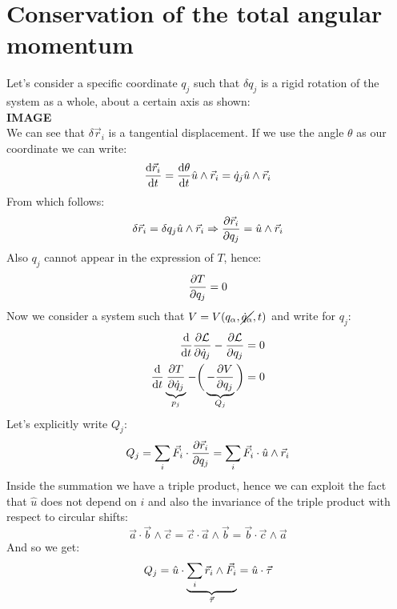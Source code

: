 \section{Conservation of the total angular momentum}
Let's consider a specific coordinate $q_j$ such that $\delta q_j$ is a rigid rotation of the system as a whole, about a certain axis as shown:
\\\textbf{IMAGE}\\
We can see that $\delta \vec{r}_i$ is a tangential displacement. If we use the angle $\theta$ as our coordinate we can write:
\begin{equation}
    \dv{\vec{r}_i}{t} = \dv{\theta}{t} \hat{u} \wedge \vec{r}_i = \dot{q}_j \hat{u} \wedge \vec{r}_i
\end{equation}
From which follows:
\begin{equation}
    \delta \vec{r}_i = \delta q_j \hat{u} \wedge \vec{r}_i \Rightarrow \pdv{\vec{r}_i}{q_j} = \hat{u} \wedge \vec{r}_i
\end{equation}
Also $q_j$ cannot appear in the expression of $T$, hence:
\begin{equation}
    \pdv{T}{q_j} = 0
\end{equation}
Now we consider a system such that $V = V(q_{\alpha},\cancel{\dot{q}_{\alpha}},t)$ and write \eleref\;for $q_j$:
\begin{equation} \label{e:ele_for_angular_momentum}
    \begin{split}
        \dv{}{t}\pdv{\lagr}{\dot{q}_j} - \pdv{\lagr}{q_j} = 0\\
        \dv{}{t}\underbrace{\pdv{T}{\dot{q}_j}}_{p_j} - \bbrackets{\underbrace{- \pdv{V}{q_j}}_{Q_j}} = 0
    \end{split}
\end{equation}
Let's explicitly write $Q_j$:
\begin{equation}
    Q_j = \bigsum_i \vec{F}_i \cdot \pdv{\vec{r}_i}{q_j} = \bigsum_i \vec{F}_i \cdot \hat{u} \wedge \vec{r}_i
\end{equation}
Inside the summation we have a triple product, hence we can exploit the fact that $\hat{u}$ does not depend on $i$ and also the invariance of the triple product with respect to circular shifts:
\begin{equation}
    \vec{a} \cdot \vec{b} \wedge \vec{c} = \vec{c} \cdot \vec{a} \wedge \vec{b} = \vec{b} \cdot \vec{c} \wedge \vec{a}
\end{equation}
And so we get:
\begin{equation}
    Q_j = \hat{u} \cdot \underbrace{\displaystyle\sum_i \vec{r}_i \wedge \vec{F}_i}_{\vec{\tau}} = \hat{u} \cdot \vec{\tau}
\end{equation}
